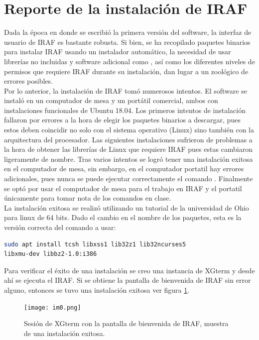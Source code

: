 \documentclass[12pt]{article}
\begin{document}
\section{Reporte de la instalación de IRAF}
Dada la época en donde se escribió la primera versión del software, la interfaz de usuario de IRAF es bastante robusta. Si bien, se ha recopilado paquetes binarios para instalar IRAF usando un instalador automático, la necesidad de usar librerías no incluidas y software adicional como , así como los diferentes niveles de permisos que requiere IRAF durante su instalación, dan lugar a un zoológico de errores posibles.\\
Por lo anterior, la instalación de IRAF tomó numerosos intentos. El software se instaló en un computador de mesa y un portátil comercial, ambos con instalaciones funcionales de Ubuntu 18.04. Los primeros intentos de instalación fallaron por errores a la hora de elegir los paquetes binarios a descargar, pues estos deben coincidir no solo con el sistema operativo (Linux) sino también con la arquitectura del procesador. Las siguientes instalaciones sufrieron de problemas a la hora de obtener las librerías de Linux que requiere IRAF pues estas cambiaron ligeramente de nombre. Tras varios intentos se logró tener una instalación exitosa en el computador de mesa, sin embargo, en el computador portatil hay errores adicionales, pues nunca se puede ejecutar correctamente el comando . Finalmente se optó por usar el computador de mesa para el trabajo en IRAF y el portatil únicamente para tomar nota de los comandos en clase.\\
La instalación exitosa se realizó utilizando un tutorial de la universidad de Ohio para linux de 64 bits\cite{OhioTutorial}. Dado el cambio en el nombre de los paquetes, esta es la versión correcta del comando a usar:

\begin{lstlisting}[language=bash]
sudo apt install tcsh libxss1 lib32z1 lib32ncurses5 
libxmu-dev libbz2-1.0:i386 
\end{lstlisting}

Para verificar el éxito de una instalación se creo una instancia de XGterm y desde ahí se ejecuta el IRAF. Si se obtiene la pantalla de bienvenida de IRAF sin error alguno, entonces se tuvo una instalación exitosa ver figura \ref{im0}.

\begin{figure}[H]
  \centering
   \texttt{[image: im0.png]}
  \caption{Sesión de XGterm con la pantalla de bienvenida de IRAF, muestra de una instalación exitosa.}
  \label{im0}
\end{figure}
\end{document}
